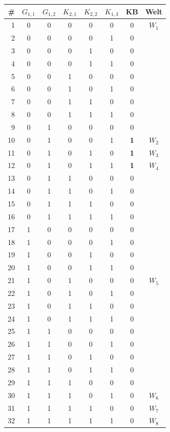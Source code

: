 \documentclass[a4paper,12pt]{article}
\begin{document}
\begin{center}
\small
\renewcommand{\arraystretch}{1.05}
\begin{tabular}{r|ccccc|c|c}
\toprule
\# & $G_{1,1}$ & $G_{1,2}$ & $K_{2,1}$ & $K_{2,2}$ & $K_{1,3}$
   & KB & Welt \\
\midrule
1  & 0 & 0 & 0 & 0 & 0 & 0 & $W_1$ \\
2  & 0 & 0 & 0 & 0 & 1 & 0 & \\
3  & 0 & 0 & 0 & 1 & 0 & 0 & \\
4  & 0 & 0 & 0 & 1 & 1 & 0 & \\
5  & 0 & 0 & 1 & 0 & 0 & 0 & \\
6  & 0 & 0 & 1 & 0 & 1 & 0 & \\
7  & 0 & 0 & 1 & 1 & 0 & 0 & \\
8  & 0 & 0 & 1 & 1 & 1 & 0 & \\
\midrule
9  & 0 & 1 & 0 & 0 & 0 & 0 & \\
10 & 0 & 1 & 0 & 0 & 1 & \textbf{1} & $W_2$ \\
11 & 0 & 1 & 0 & 1 & 0 & \textbf{1} & $W_3$ \\
12 & 0 & 1 & 0 & 1 & 1 & \textbf{1} & $W_4$ \\
13 & 0 & 1 & 1 & 0 & 0 & 0 & \\
14 & 0 & 1 & 1 & 0 & 1 & 0 & \\
15 & 0 & 1 & 1 & 1 & 0 & 0 & \\
16 & 0 & 1 & 1 & 1 & 1 & 0 & \\
\midrule
17 & 1 & 0 & 0 & 0 & 0 & 0 & \\
18 & 1 & 0 & 0 & 0 & 1 & 0 & \\
19 & 1 & 0 & 0 & 1 & 0 & 0 & \\
20 & 1 & 0 & 0 & 1 & 1 & 0 & \\
21 & 1 & 0 & 1 & 0 & 0 & 0 & $W_5$ \\
22 & 1 & 0 & 1 & 0 & 1 & 0 & \\
23 & 1 & 0 & 1 & 1 & 0 & 0 & \\
24 & 1 & 0 & 1 & 1 & 1 & 0 & \\
\midrule
25 & 1 & 1 & 0 & 0 & 0 & 0 & \\
26 & 1 & 1 & 0 & 0 & 1 & 0 & \\
27 & 1 & 1 & 0 & 1 & 0 & 0 & \\
28 & 1 & 1 & 0 & 1 & 1 & 0 & \\
29 & 1 & 1 & 1 & 0 & 0 & 0 & \\
30 & 1 & 1 & 1 & 0 & 1 & 0 & $W_6$ \\
31 & 1 & 1 & 1 & 1 & 0 & 0 & $W_7$ \\
32 & 1 & 1 & 1 & 1 & 1 & 0 & $W_8$ \\
\bottomrule
\end{tabular}
\end{center}
\end{document}
